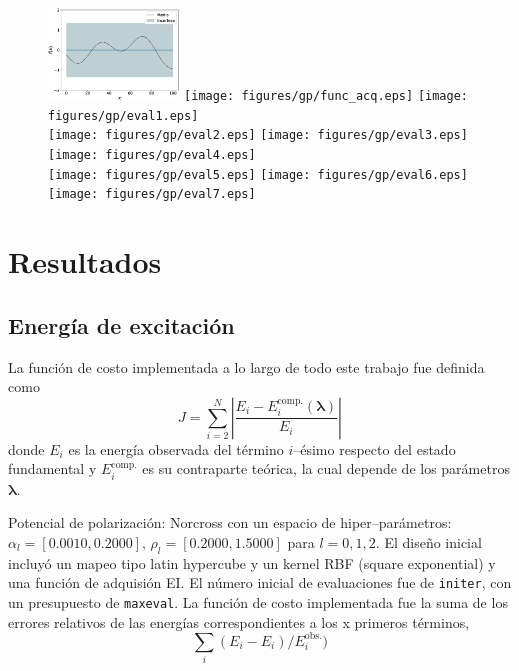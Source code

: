 \begin{figure}[H]
\centering
 \includegraphics[width=0.31\textwidth]{figures/gp/funcion.eps} 
 \texttt{[image: figures/gp/func\_acq.eps]} 
 \texttt{[image: figures/gp/eval1.eps]} \\
  \texttt{[image: figures/gp/eval2.eps]}
  \texttt{[image: figures/gp/eval3.eps]}
  \texttt{[image: figures/gp/eval4.eps]} \\
  \texttt{[image: figures/gp/eval5.eps]}
  \texttt{[image: figures/gp/eval6.eps]}
  \texttt{[image: figures/gp/eval7.eps]} 
\end{figure}


\newpage
\section{Resultados}

\subsection{Energía de excitación}
La función de costo implementada a lo largo de todo este trabajo fue 
definida como
\begin{equation}
J = \sum_{i=2}^N \left|\frac{E_{i}-E_{i}^{\textrm{comp.}}
(\boldsymbol{\lambda})}{E_{i}} \right|
\end{equation}
donde $E_{i}$ es la energía observada del término $i$--ésimo respecto del 
estado fundamental y $E_{i}^{\textrm{comp.}}$ es su contraparte teórica, 
la cual depende de los parámetros $\boldsymbol{\lambda}$.


Potencial de polarización: Norcross con un espacio de hiper--parámetros: 
$\alpha_l=[0.0010,0.2000],\,\rho_l=[0.2000,1.5000]$ para $l=0,1,2$. El 
diseño inicial incluyó un mapeo tipo latin hypercube y un kernel RBF 
(square exponential) y una función de adquisión EI. El número inicial de 
evaluaciones fue de \texttt{initer}, con un presupuesto de 
\texttt{maxeval}. La función de costo implementada fue la suma de los 
errores relativos de las energías correspondientes a los x primeros 
términos,
\begin{equation}
\sum_i (E_i-E_i)/E_i^{\textrm{obs.}})
\end{equation}



